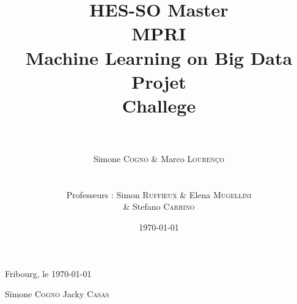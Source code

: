 \documentclass[a4paper, 12pt]{report}
\title{\huge{HES-SO Master} \\ \Huge{\textbf{\textsc{MPRI}}} \\
\LARGE{Machine Learning on Big Data} \\
\vspace{2cm} \huge{\textbf{Projet}} \\ 
\huge{Challege}}
\author{\\ \\ Simone \textsc{Cogno} \& Marco \textsc{Lourenço} \\
\\ \\
Professeurs : Simon \textsc{Ruffieux} \& Elena \textsc{Mugellini} \\ \& Stefano \textsc{Carrino}
}
\date{\today}
\begin{document}
\maketitle %
\newpage







\vspace{3cm}
Fribourg, le \today

\vspace{1cm}

\hspace{2cm} Simone \textsc{Cogno} \hspace{4cm} Jacky \textsc{Casas}

\vspace{2cm}


%
\end{document}
